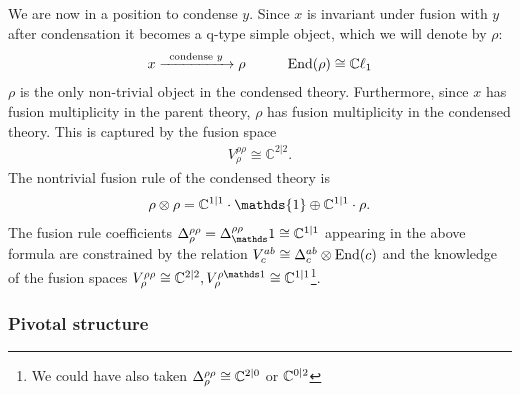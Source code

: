 We are now in a position to condense $y$.
Since $x$ is invariant under fusion with $y$ after condensation it becomes a q-type simple object, which we will denote by $\rho$:
\begin{align}
x \xrightarrow{\;\; \text{condense $y$\;\;}} \rho \quad \quad \quad \text{End}(\rho) \cong \mathbb{C} \ell_1
\end{align}
$\rho$ is the only non-trivial object in the condensed theory. 
Furthermore, since $x$ has fusion multiplicity in the parent theory, $\rho$ has fusion multiplicity in the condensed theory.
This is captured by the fusion space
\begin{align}
V^{\rho \rho}_\rho \cong \mathbb{C}^{2|2}.
\end{align}
The nontrivial fusion rule of the condensed theory is
\begin{align}
\rho \tp \rho = \mathbb{C}^{1|1}\cdot \mathds{1} \oplus \mathbb{C}^{1|1} \cdot \rho.
\end{align}
The fusion rule coefficients $\Delta^{\rho\rho}_\rho = \Delta^{\rho\rho}_\unit \cong \cc^{1|1}$ 
appearing in the above formula are constrained by the relation $V^{ab}_c \cong \Delta^{ab}_c \otimes \text{End}(c)$ and the 
knowledge of the fusion spaces $V^{\rho\rho}_\rho \cong \cc^{2|2}, V^{\rho \unit}_\rho \cong \cc^{1|1}$\footnote{We could have 
also taken $\Delta^{\rho \rho}_\rho \cong \mathbb{C}^{2|0}$ or $ \mathbb{C}^{0|2}$
}. 






\subsubsection{Pivotal structure}
\label{ESixPivotal}

